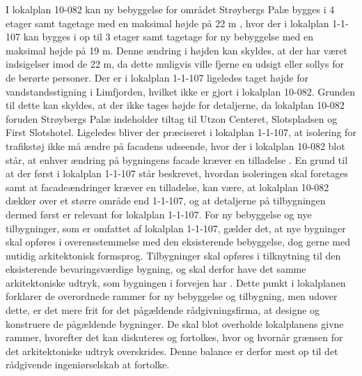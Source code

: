 I lokalplan 10-082 kan ny bebyggelse for området Strøybergs Palæ bygges i 4 etager samt tagetage med en maksimal højde på 22 m \citep[ s. 19]{gammellokalplan}, hvor der i lokalplan 1-1-107 kan bygges i op til 3 etager samt tagetage for ny bebyggelse med en maksimal højde på 19 m. Denne ændring i højden kan skyldes, at der har været indsigelser imod de 22 m, da dette muligvis ville fjerne en udsigt eller sollys for de berørte personer. 
\newline \indent{     }  Der er i lokalplan 1-1-107 ligeledes taget højde for vandstandsstigning i Limfjorden, hvilket ikke er gjort i lokalplan 10-082. Grunden til dette kan skyldes, at der ikke tages højde for detaljerne, da lokalplan 10-082 foruden Strøybergs Palæ indeholder tiltag til Utzon Centeret, Slotspladsen og First Slotshotel.
\newline \indent{     }  Ligeledes bliver der præciseret i lokalplan 1-1-107, at isolering for trafikstøj ikke må ændre på facadens udseende, hvor der i lokalplan 10-082 blot står, at enhver ændring på bygningens facade kræver en tilladelse \citep[ s. 19]{gammellokalplan}. En grund til at der først i lokalplan 1-1-107 står beskrevet, hvordan isoleringen skal foretages samt at facadeændringer kræver en tilladelse, kan være, at lokalplan 10-082 dækker over et større område end 1-1-107, og at detaljerne på tilbygningen dermed først er relevant for lokalplan 1-1-107. 
\newline \indent{     }  For ny bebyggelse og nye tilbygninger, som er omfattet af lokalplan 1-1-107, gælder det, at nye bygninger skal opføres i overensstemmelse med den eksisterende bebyggelse, dog gerne med nutidig arkitektonisk formsprog. Tilbygninger skal opføres i tilknytning til den eksisterende bevaringsværdige bygning, og skal derfor have det samme arkitektoniske udtryk, som bygningen i forvejen har \citep[ s. 7]{lokalplan}. 
\newline \indent{     }  Dette punkt i lokalplanen forklarer de overordnede rammer for ny bebyggelse og tilbygning, men udover dette, er det mere frit for det pågældende rådgivningsfirma, at designe og konstruere de pågældende bygninger. De skal blot overholde lokalplanens givne rammer, hvorefter det kan diskuteres og fortolkes, hvor og hvornår grænsen for det arkitektoniske udtryk overskrides. Denne balance er derfor mest op til det rådgivende ingeniørselskab at fortolke.

